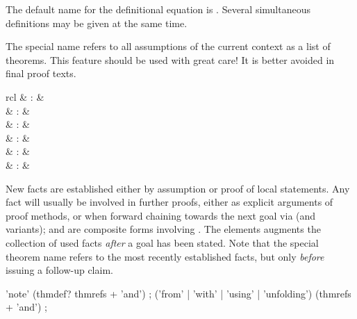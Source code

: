 \begin{isabellebody}
\begin{isamarkuptext}
\begin{descr}
  The default name for the definitional equation is .
  Several simultaneous definitions may be given at the same time.

  \end{descr}

  The special name \mbox{} refers to all assumptions of the
  current context as a list of theorems.  This feature should be used
  with great care!  It is better avoided in final proof texts.%
\end{isamarkuptext}%
\isamarkuptrue%
%
\isamarkuptrue%
%
\begin{isamarkuptext}%
\begin{matharray}{rcl}
    \mbox{} & : &  \\
    \mbox{} & : &  \\
    \mbox{} & : &  \\
    \mbox{} & : &  \\
    \mbox{} & : &  \\
    \mbox{} & : &  \\
  \end{matharray}

  New facts are established either by assumption or proof of local
  statements.  Any fact will usually be involved in further proofs,
  either as explicit arguments of proof methods, or when forward
  chaining towards the next goal via \mbox{} (and variants);
  \mbox{} and \mbox{} are composite forms
  involving \mbox{}.  The \mbox{} elements
  augments the collection of used facts \emph{after} a goal has been
  stated.  Note that the special theorem name \mbox{} refers
  to the most recently established facts, but only \emph{before}
  issuing a follow-up claim.

  \begin{rail}
    'note' (thmdef? thmrefs + 'and')
    ;
    ('from' | 'with' | 'using' | 'unfolding') (thmrefs + 'and')
    ;
  \end{rail}


\end{isamarkuptext}
\end{isabellebody}
